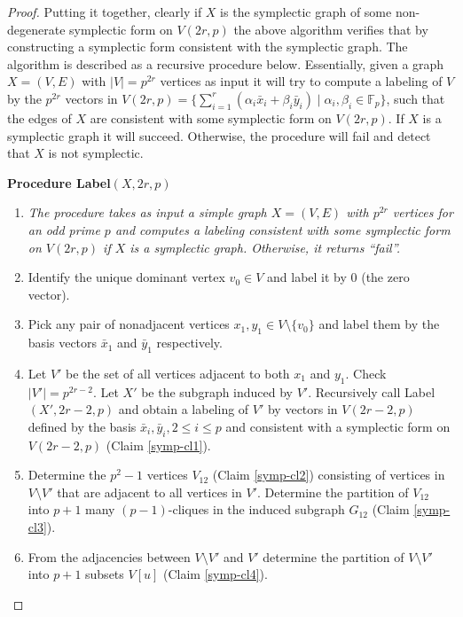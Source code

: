 \documentclass{elsarticle}
\newcommand{\F}{\mathbb{F}}
\begin{document}
\begin{proof}
Putting it together, clearly if $X$ is the symplectic graph of some
non-degenerate symplectic form on $V(2r,p)$ the above algorithm
verifies that by constructing a symplectic form consistent with the
symplectic graph. The algorithm is described as a recursive procedure
below. Essentially, given a graph $X=(V,E)$ with $|V|=p^{2r}$ vertices
as input it will try to compute a labeling of $V$ by the $p^{2r}$
vectors in
$V(2r,p)=\{\sum_{i=1}^r(\alpha_i\bar{x}_i+\beta_i\bar{y}_i)\mid
\alpha_i,\beta_i\in \F_p\}$, such that the edges of $X$ are consistent
with some symplectic form on $V(2r,p)$. If $X$ is a symplectic graph
it will succeed. Otherwise, the procedure will fail and detect that
$X$ is not symplectic.

\medbreak

\noindent\textbf{Procedure Label$(X,2r,p)$}
\begin{enumerate}
\item[] \emph{The procedure takes as input a simple graph $X=(V,E)$ with
$p^{2r}$ vertices for an odd prime $p$ and computes a
labeling consistent with some symplectic form on $V(2r,p)$ if
$X$ is a symplectic graph. Otherwise, it returns ``fail''.}

\item Identify the unique dominant vertex $v_0\in V$ and label it by
  $0$ (the zero vector).

\item Pick any pair of nonadjacent vertices $x_1, y_1\in V\setminus
  \{v_0\}$ and label them by the basis vectors $\bar{x}_1$ and
  $\bar{y}_1$ respectively.

\item Let $V'$ be the set of all vertices adjacent to both $x_1$ and
  $y_1$. Check $|V'|=p^{2r-2}$. Let $X'$ be the subgraph induced by
  $V'$. Recursively call Label$(X',2r-2,p)$ and obtain a labeling of
  $V'$ by vectors in $V(2r-2,p)$ defined by the basis
  $\bar{x}_i,\bar{y}_i, 2\le i\le p$ and consistent with a symplectic
  form on $V(2r-2,p)$ (Claim \ref{symp-cl1}).

\item Determine the $p^2-1$ vertices $V_{12}$ (Claim \ref{symp-cl2})
  consisting of vertices in $V\setminus V'$ that are adjacent to all
  vertices in $V'$. Determine the partition of $V_{12}$ into $p+1$
  many $(p-1)$-cliques in the induced subgraph $G_{12}$ (Claim
  \ref{symp-cl3}).

\item From the adjacencies between $V\setminus V'$ and $V'$ determine
  the partition of $V\setminus V'$ into $p+1$ subsets $V[u]$
  (Claim \ref{symp-cl4}).


\end{enumerate}
\end{proof}
\end{document}
